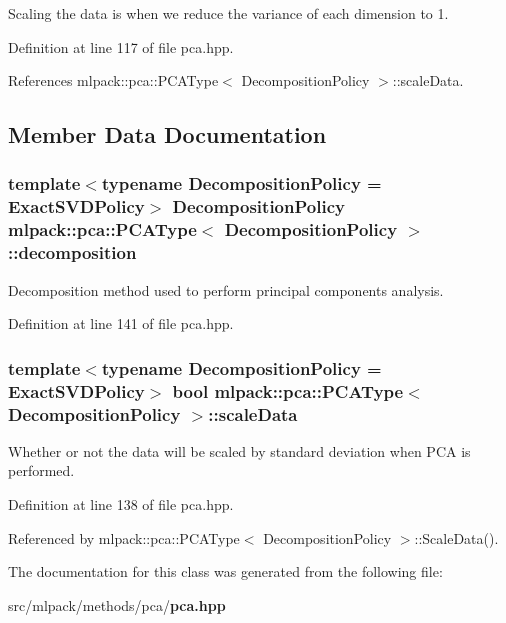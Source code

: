 Scaling the data is when we reduce the variance of each dimension to 1. 



Definition at line 117 of file pca.\+hpp.



References mlpack\+::pca\+::\+P\+C\+A\+Type$<$ Decomposition\+Policy $>$\+::scale\+Data.



\subsection{Member Data Documentation}
\subsubsection[{decomposition}]{\setlength{\rightskip}{0pt plus 5cm}template$<$typename Decomposition\+Policy  = Exact\+S\+V\+D\+Policy$>$ Decomposition\+Policy {\bf mlpack\+::pca\+::\+P\+C\+A\+Type}$<$ Decomposition\+Policy $>$\+::decomposition\hspace{0.3cm}{\ttfamily [private]}}\label{classmlpack_1_1pca_1_1PCAType_a212af59371bb9d91ebd8904380eb669e}


Decomposition method used to perform principal components analysis. 



Definition at line 141 of file pca.\+hpp.

\subsubsection[{scale\+Data}]{\setlength{\rightskip}{0pt plus 5cm}template$<$typename Decomposition\+Policy  = Exact\+S\+V\+D\+Policy$>$ bool {\bf mlpack\+::pca\+::\+P\+C\+A\+Type}$<$ Decomposition\+Policy $>$\+::scale\+Data\hspace{0.3cm}{\ttfamily [private]}}\label{classmlpack_1_1pca_1_1PCAType_a0619edd97ebbede0256519368a1decec}


Whether or not the data will be scaled by standard deviation when P\+CA is performed. 



Definition at line 138 of file pca.\+hpp.



Referenced by mlpack\+::pca\+::\+P\+C\+A\+Type$<$ Decomposition\+Policy $>$\+::\+Scale\+Data().



The documentation for this class was generated from the following file\+:\begin{DoxyCompactItemize}
\item 
src/mlpack/methods/pca/{\bf pca.\+hpp}\end{DoxyCompactItemize}
